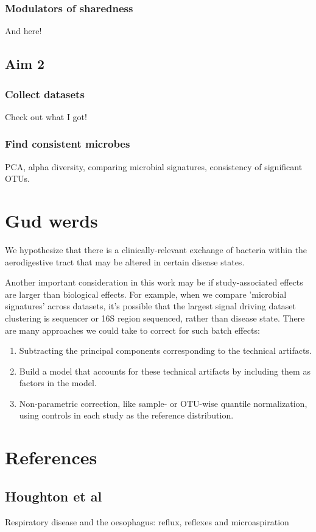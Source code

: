 \documentclass[12pt]{article}
\begin{document}
\subsubsection{Modulators of sharedness}
And here!

\subsection{Aim 2}
\subsubsection{Collect datasets}
Check out what I got!

\subsubsection{Find consistent microbes}
PCA, alpha diversity, comparing microbial signatures, consistency of significant OTUs.

\section{Gud werds}
We hypothesize that there is a clinically-relevant exchange of bacteria within the aerodigestive tract that may be altered in certain disease states. 


Another important consideration in this work may be if study-associated effects are larger than biological effects. For example, when we compare 'microbial signatures' across datasets, it's possible that the largest signal driving dataset clustering is sequencer or 16S region sequenced, rather than disease state. There are many approaches we could take to correct for such batch effects:
\begin{enumerate}
	\item Subtracting the principal components corresponding to the technical artifacts.
	\item Build a model that accounts for these technical artifacts by including them as factors in the model.
	\item Non-parametric correction, like sample- or OTU-wise quantile normalization, using controls in each study as the reference distribution.
\end{enumerate}

\section{References}
\subsection{Houghton et al}\label{ref:houghton_2016}
Respiratory disease and the  oesophagus: reflux, reflexes and microaspiration
\end{document}
